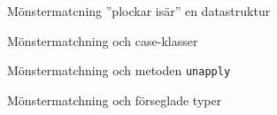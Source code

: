 

\ifkompendium\else
{}
\begin{Slide}{Mönstermatcning ''plockar isär'' en datastruktur}
\end{Slide}

\begin{Slide}{Mönstermatchning och case-klasser}
\end{Slide}

\begin{Slide}{Mönstermatchning och metoden \texttt{unapply}}
\end{Slide}

\begin{Slide}{Mönstermatchning och förseglade typer}
\end{Slide}
\fi












